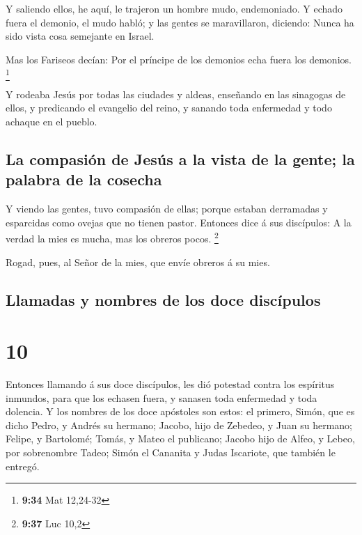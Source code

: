  Y saliendo ellos, he aquí, le trajeron un hombre mudo,
endemoniado.  Y echado fuera el demonio, el mudo habló; y
las gentes se maravillaron, diciendo: Nunca ha sido vista cosa semejante
en Israel.

 Mas los Fariseos decían: Por el príncipe de los demonios
echa fuera los demonios. \footnote{\textbf{9:34} Mat 12,24-32}

 Y rodeaba Jesús por todas las ciudades y aldeas, enseñando
en las sinagogas de ellos, y predicando el evangelio del reino, y
sanando toda enfermedad y todo achaque en el pueblo.

\hypertarget{la-compasiuxf3n-de-jesuxfas-a-la-vista-de-la-gente-la-palabra-de-la-cosecha}{%
\subsection{La compasión de Jesús a la vista de la gente; la palabra de
la
cosecha}\label{la-compasiuxf3n-de-jesuxfas-a-la-vista-de-la-gente-la-palabra-de-la-cosecha}}

 Y viendo las gentes, tuvo compasión de ellas; porque
estaban derramadas y esparcidas como ovejas que no tienen pastor.
 Entonces dice á sus discípulos: A la verdad la mies es
mucha, mas los obreros pocos. \footnote{\textbf{9:37} Luc 10,2}

 Rogad, pues, al Señor de la mies, que envíe obreros á su
mies.

\hypertarget{llamadas-y-nombres-de-los-doce-discuxedpulos}{%
\subsection{Llamadas y nombres de los doce
discípulos}\label{llamadas-y-nombres-de-los-doce-discuxedpulos}}

\hypertarget{section-9}{%
\section{10}\label{section-9}}

 Entonces llamando á sus doce discípulos, les dió potestad
contra los espíritus inmundos, para que los echasen fuera, y sanasen
toda enfermedad y toda dolencia.  Y los nombres de los doce
apóstoles son estos: el primero, Simón, que es dicho Pedro, y Andrés su
hermano; Jacobo, hijo de Zebedeo, y Juan su hermano; 
Felipe, y Bartolomé; Tomás, y Mateo el publicano; Jacobo hijo de Alfeo,
y Lebeo, por sobrenombre Tadeo;  Simón el Cananita y Judas
Iscariote, que también le entregó.

